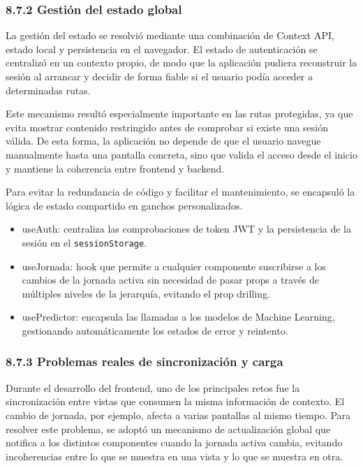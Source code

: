 \subsubsection{8.7.2 Gestión del estado global}

La gestión del estado se resolvió mediante una combinación de Context API, estado local y persistencia en el navegador. El estado de autenticación se 
centralizó en un contexto propio, de modo que la aplicación pudiera reconstruir la sesión al arrancar y decidir de forma fiable si el usuario podía acceder a determinadas rutas.

Este mecanismo resultó especialmente importante en las rutas protegidas, ya que evita mostrar contenido restringido antes de comprobar si existe una 
sesión válida. De esta forma, la aplicación no depende de que el usuario navegue manualmente hasta una pantalla concreta, sino que valida el acceso 
desde el inicio y mantiene la coherencia entre frontend y backend.

Para evitar la redundancia de código y facilitar el mantenimiento, se encapsuló la lógica de estado compartido en ganchos personalizados.

\begin{itemize}
\item useAuth: centraliza las comprobaciones de token JWT y la persistencia de la sesión en el \texttt{sessionStorage}.

\item useJornada: hook que permite a cualquier componente suscribirse a los cambios de la jornada activa sin necesidad de pasar props a través de múltiples niveles de la jerarquía, evitando el prop drilling.

\item usePredictor: encapsula las llamadas a los modelos de Machine Learning, gestionando automáticamente los estados de error y reintento.
\end{itemize}

\subsubsection{8.7.3 Problemas reales de sincronización y carga}

Durante el desarrollo del frontend, uno de los principales retos fue la sincronización entre vistas que consumen la misma información de contexto.
 El cambio de jornada, por ejemplo, afecta a varias pantallas al mismo tiempo. Para resolver este problema, se adoptó un mecanismo de actualización
  global que notifica a los distintos componentes cuando la jornada activa cambia, evitando incoherencias entre lo que se muestra en una vista y lo que se muestra en otra.

